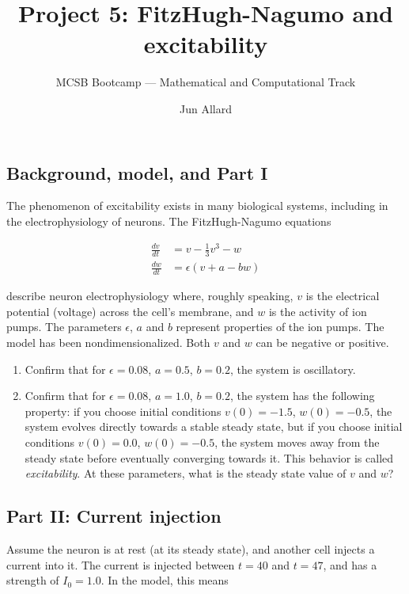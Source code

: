 \documentclass[
  letterpaper,
  DIV=11,
  numbers=noendperiod]{scrartcl}
\title{Project 5: FitzHugh-Nagumo and excitability}
\subtitle{MCSB Bootcamp --- Mathematical and Computational Track}
\author{Jun Allard}
\date{}
\providecommand{\tightlist}{%
  \setlength{\itemsep}{0pt}\setlength{\parskip}{0pt}}
\begin{document}
\maketitle


\subsection{Background, model, and Part
I}\label{background-model-and-part-i}

The phenomenon of excitability exists in many biological systems,
including in the electrophysiology of neurons. The FitzHugh-Nagumo
equations

\[
\begin{aligned}
\frac{dv}{dt} &= v - \frac{1}{3} v^3 - w \\
\frac{dw}{dt} &= \epsilon \left( v + a - bw\right)
\end{aligned}
\]

describe neuron electrophysiology where, roughly speaking, \(v\) is the
electrical potential (voltage) across the cell's membrane, and \(w\) is
the activity of ion pumps. The parameters \(\epsilon\), \(a\) and \(b\)
represent properties of the ion pumps. The model has been
nondimensionalized. Both \(v\) and \(w\) can be negative or positive.

\begin{enumerate}
\def\labelenumi{\alph{enumi}.}
\tightlist
\item
  Confirm that for \(\epsilon=0.08\), \(a=0.5\), \(b=0.2\), the system
  is oscillatory.
\item
  Confirm that for \(\epsilon=0.08\), \(a=1.0\), \(b=0.2\), the system
  has the following property: if you choose initial conditions
  \(v(0)=-1.5\), \(w(0)=-0.5\), the system evolves directly towards a
  stable steady state, but if you choose initial conditions
  \(v(0)=0.0\), \(w(0)=-0.5\), the system moves away from the steady
  state before eventually converging towards it. This behavior is called
  \emph{excitability}. At these parameters, what is the steady state
  value of \(v\) and \(w\)?
\end{enumerate}

\subsection{Part II: Current injection}\label{part-ii-current-injection}

Assume the neuron is at rest (at its steady state), and another cell
injects a current into it. The current is injected between \(t=40\) and
\(t=47\), and has a strength of \(I_0=1.0\). In the model, this means
\end{document}
